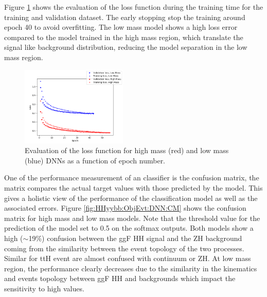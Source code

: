 Figure \ref{fig:HHyybb:ObjEvt:DNN:Loss} shows the evaluation of the loss function during the training time for the training and validation dataset. The early stopping stop the training around epoch 40 to avoid overfitting. The low mass model shows a high loss error compared to the model trained in the high mass region, which translate the signal like background distribution, reducing the model separation in the low mass region.
\begin{figure}[htbp]
    \centering
    \includegraphics[width=0.45\textwidth]{Ch5/Img/Loss_DNN.png}
    \caption{Evaluation of the loss function for high mass (red) and low mass (blue) DNNs as a function of epoch number.}
    \label{fig:HHyybb:ObjEvt:DNN:Loss}
\end{figure}
One of the performance measurement of an classifier is the confusion matrix, the matrix compares the actual target values with those predicted by the model. This gives a holistic view of the performance of the classification model as well as the associated errors. Figure \ref{fig:HHyybb:ObjEvt:DNN:CM} shows the confusion matrix for high mass and low mass models. Note that the threshold value for the prediction of the model set to 0.5 on the softmax outputs. Both models show a high ($\sim$19\%) confusion between the ggF HH signal and the ZH background coming from the similarity between the event topology of the two processes. Similar for ttH event are almost confused with continuum or ZH. At low mass region, the performance clearly decreases due to the similarity in the kinematics and events topology between ggF HH and backgrounds which impact the sensitivity to high \kl values.
